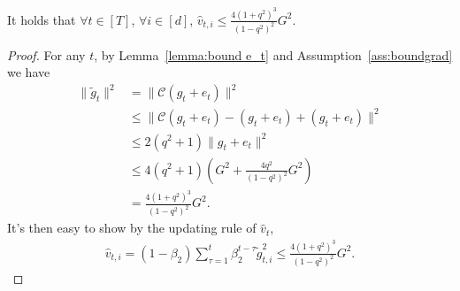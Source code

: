 \documentclass[11pt]{article}
\begin{document}
\begin{Lemma} \label{lemma:bound v_t}
It holds that $\forall t\in [T]$, $\forall i\in [d]$, $\hat v_{t,i}\leq \frac{4(1+q^2)^3}{(1-q^2)^2}G^2$.

\end{Lemma}

\begin{proof}
For any $t$, by Lemma~\ref{lemma:bound e_t} and Assumption~\ref{ass:boundgrad} we have
\begin{align*}
    \|\tilde g_t\|^2&=\|\mathcal C(g_t+e_t)\|^2\\
    &\leq \|\mathcal C(g_t+e_t)-(g_t+e_t)+(g_t+e_t)\|^2\\
    &\leq 2(q^2+1)\|g_t+e_t\|^2\\
    &\leq 4(q^2+1)(G^2+\frac{4q^2}{(1-q^2)^2}G^2)\\
    &=\frac{4(1+q^2)^3}{(1-q^2)^2}G^2.
\end{align*}
It's then easy to show by the updating rule of $\hat v_t$,
\begin{align*}
    \hat v_{t,i}=(1-\beta_2)\sum_{\tau=1}^t \beta_2^{t-\tau} \tilde g_{t,i}^2\leq \frac{4(1+q^2)^3}{(1-q^2)^2}G^2.
\end{align*}

\end{proof}
%
%
%
%
%
\end{document}
